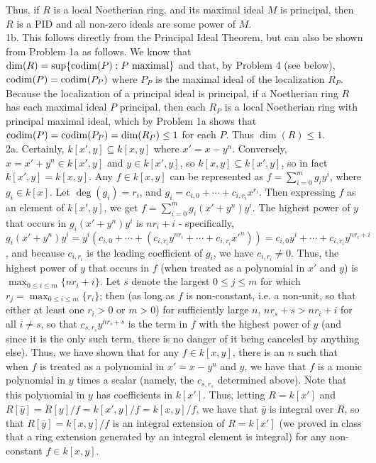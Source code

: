 \documentclass[11pt]{article}
\begin{document}
Thus, if $R$ is a local Noetherian ring, and its maximal ideal $M$ is principal, then $R$ is a PID and all non-zero ideals are some power of $M$.\\

\num{1b.} This follows directly from the Principal Ideal Theorem, but can also be shown from Problem 1a as follows. We know that $\operatorname{dim}(R)=\sup\{\operatorname{codim}(P):P\text{ maximal}\}$ and that, by Problem 4 (see below), $\operatorname{codim}(P)=\operatorname{codim}(P_P)$ where $P_P$ is the maximal ideal of the localization $R_P$. Because the localization of a principal ideal is principal, if a Noetherian ring $R$ has each maximal ideal $P$ principal, then each $R_P$ is a local Noetherian ring with principal maximal ideal, which by Problem 1a shows that $\operatorname{codim}(P)=\operatorname{codim}(P_P)=\operatorname{dim}(R_P)\leq1$ for each $P$. Thus $\dim(R)\leq 1$.    \\


\num{2a.} Certainly, $k[x',y]\subseteq k[x,y]$ where $x'=x-y^n$. Conversely, $x=x'+y^n\in k[x',y]$ and $y\in k[x',y]$, so $k[x,y]\subseteq k[x',y]$, so in fact $k[x',y]=k[x,y]$. Any $f\in k[x,y]$ can be represented as $f=\sum_{i=0}^m g_iy^i$, where $g_i\in k[x]$. Let $\deg(g_i)=r_i$, and $g_i=c_{i,0}+\cdots+c_{i,r_i}x^{r_i}$. Then expressing $f$ as an element of $k[x',y]$, we get $f=\sum_{i=0}^m g_i(x'+y^n)y^i$. The highest power of $y$ that occurs in $g_i(x'+y^n)y^i$ is $nr_i+i$ - specifically, $g_i(x'+y^n)y^i=y^i(c_{i,0}+\cdots+(c_{i,r_i}y^{nr_i}+\cdots+c_{i,r_i}x'^n))=c_{i,0}y^i+\cdots+c_{i,r_i}y^{nr_i+i}$, and because $c_{i,r_i}$ is the leading coefficient of $g_i$, we have $c_{i,r_i}\neq0$. Thus, the highest power of $y$ that occurs in $f$ (when treated as a polynomial in $x'$ and $y$) is $\max_{0\leq i\leq m}\{nr_i+i\}$. Let $s$ denote the largest $0\leq j\leq m$ for which $r_j=\max_{0\leq i\leq m}\{r_i\}$; then (as long as $f$ is non-constant, i.e. a non-unit, so that either at least one $r_i>0$ or $m>0$) for sufficiently large $n$, $nr_s+s>nr_i+i$ for all $i\neq s$, so that $c_{s,r_s}y^{nr_s+s}$ is the term in $f$ with the highest power of $y$ (and since it is the only such term, there is no danger of it being canceled by anything else). Thus, we have shown that for any $f\in k[x,y]$, there is an $n$ such that when $f$ is treated as a polynomial in $x'=x-y^n$ and $y$, we have that $f$ is a monic polynomial in $y$ times a scalar (namely, the $c_{s,r_s}$ determined above). Note that this polynomial in $y$ has coefficients in $k[x']$. Thus, letting $R=k[x']$ and $R[\bar{y}]=R[y]/f=k[x',y]/f=k[x,y]/f$, we have that $\bar{y}$ is integral over $R$, so that $R[\bar{y}]=k[x,y]/f$ is an integral extension of $R=k[x']$ (we proved in class that a ring extension generated by an integral element is integral) for any non-constant $f\in k[x,y]$. \\
\end{document}
